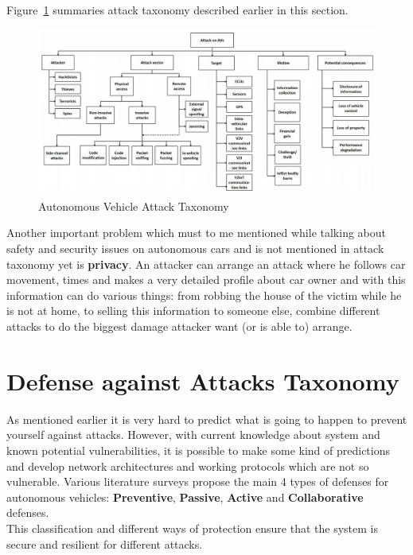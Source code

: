 Figure~\ref{fig:AttackTaxonomy} summaries attack taxonomy described earlier in this section.

\begin{figure}[h]
	\centering  	
	\includegraphics[width=15cm]{img/6.jpg}
	\caption{Autonomous Vehicle Attack Taxonomy \cite{sec}}
	\label{fig:AttackTaxonomy}    
\end{figure}

Another important problem which must to me mentioned while talking about safety and security issues on autonomous cars and is not mentioned in attack taxonomy yet is \textbf{privacy}. An attacker can arrange an attack where he follows car movement, times and makes a very detailed profile about car owner and with this information can do various things: from robbing the house of the victim while he is not at home, to selling this information to someone else, combine different attacks to do the biggest damage attacker want (or is able to) arrange.

\section{Defense against Attacks Taxonomy}

As mentioned earlier it is very hard to predict what is going to happen to prevent yourself against attacks. However, with current knowledge about system and known potential vulnerabilities, it is possible to make some kind of predictions and develop network architectures and working protocols which are not so vulnerable. Various literature surveys propose the main 4 types of defenses for autonomous vehicles: \textbf{Preventive}, \textbf{Passive}, \textbf{Active} and \textbf{Collaborative} defenses. \\
This classification and different ways of protection ensure that the system is secure and resilient for different attacks.

